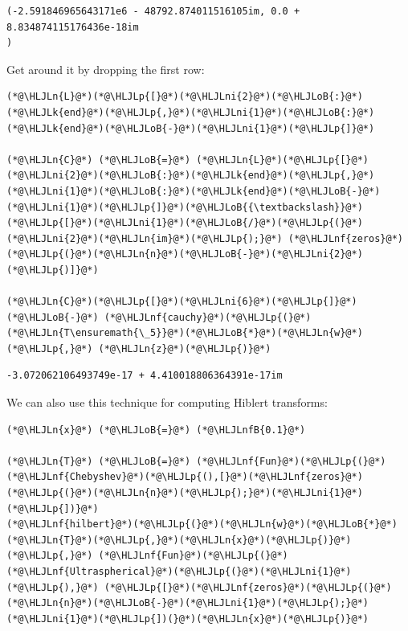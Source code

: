 \documentclass[12pt,a4paper]{article}
\newcommand{\HLJLk}[1]{\textcolor[RGB]{148,91,176}{\textbf{#1}}}
\newcommand{\HLJLn}[1]{#1}
\newcommand{\HLJLnf}[1]{\textcolor[RGB]{66,102,213}{#1}}
\newcommand{\HLJLnfB}[1]{\textcolor[RGB]{59,151,46}{#1}}
\newcommand{\HLJLni}[1]{\textcolor[RGB]{59,151,46}{#1}}
\newcommand{\HLJLoB}[1]{\textcolor[RGB]{102,102,102}{\textbf{#1}}}
\newcommand{\HLJLp}[1]{#1}
\begin{document}
\begin{lstlisting}
(-2.591846965643171e6 - 48792.874011516105im, 0.0 + 8.834874115176436e-18im
)
\end{lstlisting}


Get around it by dropping the first row:


\begin{lstlisting}
(*@\HLJLn{L}@*)(*@\HLJLp{[}@*)(*@\HLJLni{2}@*)(*@\HLJLoB{:}@*)(*@\HLJLk{end}@*)(*@\HLJLp{,}@*)(*@\HLJLni{1}@*)(*@\HLJLoB{:}@*)(*@\HLJLk{end}@*)(*@\HLJLoB{-}@*)(*@\HLJLni{1}@*)(*@\HLJLp{]}@*)

(*@\HLJLn{C}@*) (*@\HLJLoB{=}@*) (*@\HLJLn{L}@*)(*@\HLJLp{[}@*)(*@\HLJLni{2}@*)(*@\HLJLoB{:}@*)(*@\HLJLk{end}@*)(*@\HLJLp{,}@*)(*@\HLJLni{1}@*)(*@\HLJLoB{:}@*)(*@\HLJLk{end}@*)(*@\HLJLoB{-}@*)(*@\HLJLni{1}@*)(*@\HLJLp{]}@*)(*@\HLJLoB{{\textbackslash}}@*) (*@\HLJLp{[}@*)(*@\HLJLni{1}@*)(*@\HLJLoB{/}@*)(*@\HLJLp{(}@*)(*@\HLJLni{2}@*)(*@\HLJLn{im}@*)(*@\HLJLp{);}@*) (*@\HLJLnf{zeros}@*)(*@\HLJLp{(}@*)(*@\HLJLn{n}@*)(*@\HLJLoB{-}@*)(*@\HLJLni{2}@*)(*@\HLJLp{)]}@*)

(*@\HLJLn{C}@*)(*@\HLJLp{[}@*)(*@\HLJLni{6}@*)(*@\HLJLp{]}@*)(*@\HLJLoB{-}@*) (*@\HLJLnf{cauchy}@*)(*@\HLJLp{(}@*)(*@\HLJLn{T\ensuremath{\_5}}@*)(*@\HLJLoB{*}@*)(*@\HLJLn{w}@*)(*@\HLJLp{,}@*) (*@\HLJLn{z}@*)(*@\HLJLp{)}@*)
\end{lstlisting}

\begin{lstlisting}
-3.072062106493749e-17 + 4.410018806364391e-17im
\end{lstlisting}


We can also use this technique for computing Hiblert transforms:


\begin{lstlisting}
(*@\HLJLn{x}@*) (*@\HLJLoB{=}@*) (*@\HLJLnfB{0.1}@*)

(*@\HLJLn{T}@*) (*@\HLJLoB{=}@*) (*@\HLJLnf{Fun}@*)(*@\HLJLp{(}@*)(*@\HLJLnf{Chebyshev}@*)(*@\HLJLp{(),[}@*)(*@\HLJLnf{zeros}@*)(*@\HLJLp{(}@*)(*@\HLJLn{n}@*)(*@\HLJLp{);}@*)(*@\HLJLni{1}@*)(*@\HLJLp{])}@*)
(*@\HLJLnf{hilbert}@*)(*@\HLJLp{(}@*)(*@\HLJLn{w}@*)(*@\HLJLoB{*}@*)(*@\HLJLn{T}@*)(*@\HLJLp{,}@*)(*@\HLJLn{x}@*)(*@\HLJLp{)}@*) (*@\HLJLp{,}@*) (*@\HLJLnf{Fun}@*)(*@\HLJLp{(}@*)(*@\HLJLnf{Ultraspherical}@*)(*@\HLJLp{(}@*)(*@\HLJLni{1}@*)(*@\HLJLp{),}@*) (*@\HLJLp{[}@*)(*@\HLJLnf{zeros}@*)(*@\HLJLp{(}@*)(*@\HLJLn{n}@*)(*@\HLJLoB{-}@*)(*@\HLJLni{1}@*)(*@\HLJLp{);}@*)(*@\HLJLni{1}@*)(*@\HLJLp{])(}@*)(*@\HLJLn{x}@*)(*@\HLJLp{)}@*)
\end{lstlisting}
\end{document}
